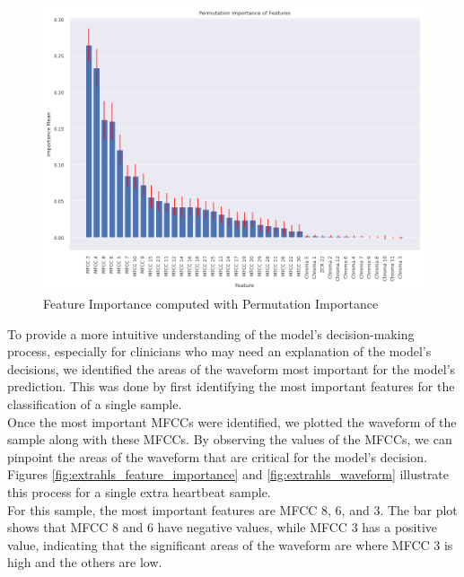 \begin{figure}[h]
    \centering
    \includegraphics[width=\columnwidth]{../images/permutation_feature_importance.png}
    \caption{Feature Importance computed with Permutation Importance}
    \label{fig:permutation_feature_importance}
\end{figure}

To provide a more intuitive understanding of the model's decision-making process, especially for clinicians who may need an explanation of the model's decisions,
we identified the areas of the waveform most important for the model's prediction. This was done by first identifying the most important features
for the classification of a single sample. \\
Once the most important MFCCs were identified, we plotted the waveform of the sample along with these MFCCs.
By observing the values of the MFCCs, we can pinpoint the areas of the waveform that are critical for the model's decision.
Figures \ref{fig:extrahls_feature_importance} and \ref{fig:extrahls_waveform} illustrate this process for a single extra heartbeat sample. \\
For this sample, the most important features are MFCC 8, 6, and 3. The bar plot shows that MFCC 8 and 6 have negative values,
while MFCC 3 has a positive value, indicating that the significant areas of the waveform are where MFCC 3 is high and the others are low.

